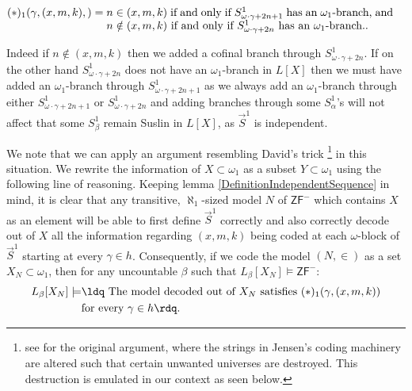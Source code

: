 \documentclass[a4paper,11pt]{article}
\newcommand{\ZFP}{\mathsf{ZF}^-}
\begin{document}
\begin{align*}
   (\ast)_1({\gamma},(x,m,k),) = {} & \parbox[t]{0.75\textwidth}{$n \in (x,m,k)$ if and only if $S^1_{\omega \cdot \gamma +2n+1}$ has an $\omega_1$-branch, and $n \notin (x,m,k)$ if and only if $S^1_{\omega \cdot \gamma +2n}$ has an $\omega_1$-branch..}
\end{align*}

Indeed if $n \notin (x,m,k)$ then we added a cofinal branch through $S^1_{\omega \cdot \gamma+ 2n}$. If on the other hand $S^1_{\omega \cdot\gamma +2n}$ does not have an $\omega_1$-branch in $L[X]$ then we must have added an $\omega_1$-branch through $S^1_{\omega \cdot \gamma +2n+1}$ as we always add an $\omega_1$-branch through either $S^1_{\omega \cdot \gamma +2n+1}$ or $S^1_{\omega \cdot \gamma +2n}$ and adding branches through some $S^1_{\alpha}$'s  will not affect that some $S^1_{\beta}$ remain Suslin in $L[X]$, as $\vec{S}^1$ is independent.



We note that we can apply an argument resembling David's trick \footnote{see \cite{David} for the original argument, where the strings in Jensen's coding machinery are altered such that certain unwanted universes are destroyed. This destruction is emulated in our context as seen below.} in this situation. We rewrite the information of $X \subset \omega_1$ as a subset $Y \subset \omega_1$ using the following line of reasoning.
Keeping lemma \ref{DefinitionIndependentSequence} in mind, it is clear that any transitive, $\aleph_1$-sized model $N$ of $\ZFP$ which contains $X$ as an element will be able to first define $\vec{S}^1$ correctly  and also correctly decode out of $X$ all the information regarding $(x,m,k)$ being coded at each $\omega$-block of $\vec{S}^1$ starting at every $\gamma \in h$. 
Consequently, if we code the model $(N,\in)$ as a set $X_N \subset \omega_1$, then for any uncountable $\beta$ such that $L_{\beta}[X_N] \models \ZFP$:
\begin{align*}
    L_{\beta}[X_N] \models & \text{\ldq The model decoded out of }X_N \text{ satisfies $(\ast)_{1}(\gamma,(x,m,k))$} \\& \text{for every $\gamma \in h$\rdq.}
\end{align*}
\end{document}
